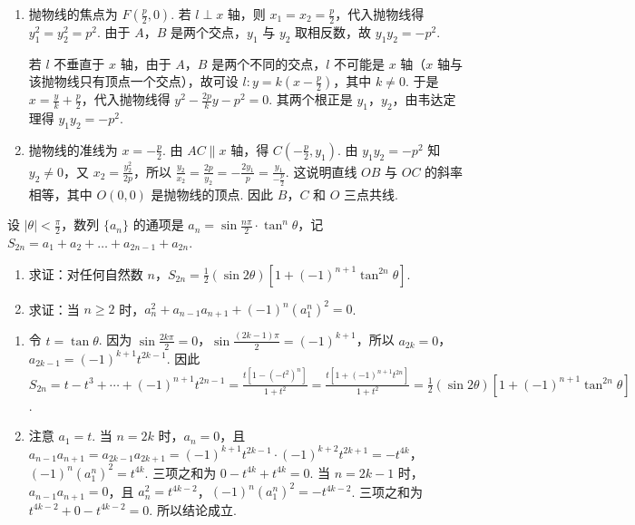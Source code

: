 \begin{solution}
\begin{enumerate}
\item
抛物线的焦点为 \(F\left(\frac p2,0\right)\). 若 \(l\perp x\) 轴，则 \(x_{1}=x_{2}=\frac p2\)，代入抛物线得 \(y_{1}^{2}=y_{2}^{2}=p^{2}\). 由于 \(A\)，\(B\) 是两个交点，\(y_{1}\) 与 \(y_{2}\) 取相反数，故 \(y_{1}y_{2}=-p^{2}\).

若 \(l\) 不垂直于 \(x\) 轴，由于 \(A\)，\(B\) 是两个不同的交点，\(l\) 不可能是 \(x\) 轴（\(x\) 轴与该抛物线只有顶点一个交点），故可设 \(l:y=k\left(x-\frac p2\right)\)，其中 \(k\neq0\). 于是 \(x=\frac yk+\frac p2\)，代入抛物线得 \(y^{2}-\frac{2p}{k}y-p^{2}=0\). 其两个根正是 \(y_{1}\)，\(y_{2}\)，由韦达定理得 \(y_{1}y_{2}=-p^{2}\).
\item
抛物线的准线为 \(x=-\frac p2\). 由 \(AC\parallel x\) 轴，得 \(C\left(-\frac p2,y_{1}\right)\). 由 \(y_{1}y_{2}=-p^{2}\) 知 \(y_{2}\neq0\)，又 \(x_{2}=\frac{y_{2}^{2}}{2p}\)，所以
\(\frac{y_{2}}{x_{2}}=\frac{2p}{y_{2}}=-\frac{2y_{1}}{p}=\frac{y_{1}}{-\frac{p}{2}}\).
这说明直线 \(OB\) 与 \(OC\) 的斜率相等，其中 \(O(0,0)\) 是抛物线的顶点. 因此 \(B\)，\(C\) 和 \(O\) 三点共线.
\end{enumerate}
\end{solution}

\begin{problem}
设 \(|\theta|<\frac\pi2\)，数列 \(\{a_n\}\) 的通项是 \(a_n=\sin\frac{n\pi}{2}\cdot\tan^{n}\theta\)，记 \(S_{2n}=a_{1}+a_{2}+\dots+a_{2n-1}+a_{2n}\).
\begin{enumerate}
\item 求证：对任何自然数 \(n\)，\(S_{2n}=\frac12(\sin2\theta)[1+(-1)^{n+1}\tan^{2n}\theta]\).
\item 求证：当 \(n\geqslant2\) 时，\(a_n^{2}+a_{n-1}a_{n+1}+(-1)^n(a_{1}^{n})^{2}=0\).
\end{enumerate}
\end{problem}

\begin{solution}
\begin{enumerate}
\item
令 \(t=\tan\theta\). 因为 \(\sin\frac{2k\pi}{2}=0\)，\(\sin\frac{(2k-1)\pi}{2}=(-1)^{k+1}\)，所以 \(a_{2k}=0\)，\(a_{2k-1}=(-1)^{k+1}t^{2k-1}\). 因此
\(S_{2n}=t-t^{3}+\cdots+(-1)^{n+1}t^{2n-1}=\frac{t\left[1-(-t^{2})^{n}\right]}{1+t^{2}}=\frac{t\left[1+(-1)^{n+1}t^{2n}\right]}{1+t^{2}}=\frac12(\sin2\theta)\left[1+(-1)^{n+1}\tan^{2n}\theta\right]\).
\item
注意 \(a_{1}=t\). 当 \(n=2k\) 时，\(a_{n}=0\)，且
\(a_{n-1}a_{n+1}=a_{2k-1}a_{2k+1}=(-1)^{k+1}t^{2k-1}\cdot(-1)^{k+2}t^{2k+1}=-t^{4k}\)，
\((-1)^{n}(a_{1}^{n})^{2}=t^{4k}\). 三项之和为 \(0-t^{4k}+t^{4k}=0\).
当 \(n=2k-1\) 时，\(a_{n-1}a_{n+1}=0\)，且 \(a_{n}^{2}=t^{4k-2}\)，\((-1)^{n}(a_{1}^{n})^{2}=-t^{4k-2}\). 三项之和为 \(t^{4k-2}+0-t^{4k-2}=0\). 所以结论成立.
\end{enumerate}
\end{solution}
